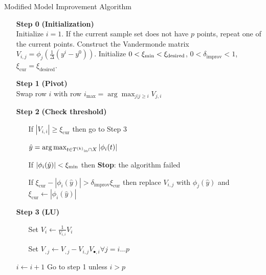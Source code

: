 \begin{algorithm}[H]
    \caption{Modified Model Improvement Algorithm}
    \label{modified_model_improving_algorithm}
    \begin{itemize}
        \item[\textbf{Step 0}] \textbf{(Initialization)} \\
            Initialize $i=1$.
            If the current sample set does not have $p$ points, repeat one of the current points. 
            Construct the Vandermonde matrix $V_{i,j} = \phi_j(\frac 1 {\Delta}(y^i - y^0))$.
            Initialize $0 < \xi_{\text{min}} < \xi_{\text{desired}}$, $0 <\delta_{\text{improv}} < 1$,
            $  \xi_{\text{cur}} = \xi_{\text{desired}}$.
            
        \item[\textbf{Step 1}] \textbf{(Pivot)} \\
            Swap row $i$ with row $i_{\max} = \arg \max_{j|j\ge i} V_{j,i} $
        
        \item[\textbf{Step 2}] \textbf{(Check threshold)} \begin{itemize}
                \item[] If $|V_{i,i}| \ge \xi_{\text{cur}} $ then go to Step 3
                \item[] $ \hat y = \arg\max_{t \in {T^{(k)}}_{\text{in}} \cap X} |\phi_i(t)|$
                \item[] If $\label{impossibly_poised} |\phi_i(\hat y)| < \xi_{\text{min}}$ then \textbf{Stop}: the algorithm failed
                \item[] If $\xi_{\text{cur}} - |\phi_i(\hat y)| > \delta_{\text{improv}} \xi_{\text{cur}}$ then replace $V_{i,j}$ with $\phi_j(\hat y)$ and $\xi_{\text{cur}} \gets |\phi_i(\hat y)|$
            \end{itemize}
        
        \item[\textbf{Step 3}] \textbf{(LU)} \begin{itemize}
                \item[] Set $V_i \gets \frac{1}{V_{i,i}} V_i$
                \item[] Set $V_{,j} \gets V_{, j} - V_{i,j} V_{\bullet, i} \forall j=i \ldots p$
            \end{itemize}
            $i \gets i+1$
            Go to step 1 unless $i > p$
    \end{itemize}
\end{algorithm}

